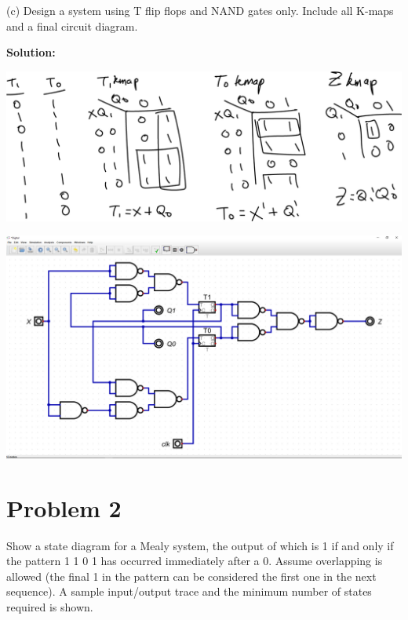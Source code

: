 \documentclass{article}
\begin{document}
    (c) Design a system using T flip flops and NAND gates only. Include all K-maps and a 
    final circuit diagram.
    
    \textbf{Solution:}

    \begin{center}
        \includegraphics[width=\linewidth]{Q1_Kmaps.png}
    \end{center}

    \begin{center}
        \includegraphics[width=\linewidth]{Q1_c2.jpg}
    \end{center}


    \section*{Problem 2}

    Show a state diagram for a Mealy system, the output of which is 1 if and only if the 
    pattern 1 1 0 1 has occurred immediately after a 0. Assume overlapping is allowed 
    (the final 1 in the pattern can be considered the first one in the next sequence). 
    A sample input/output trace and the minimum number of states required is shown.
\end{document}
